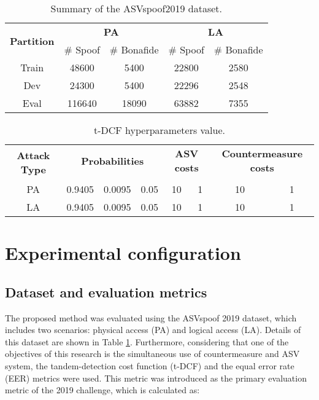 \documentclass[a4paper]{article}
\begin{document}
\begin{table}[H]
\caption{Summary of the ASVspoof2019 dataset.}
\centering
\begin{tabular}{|c|cc|cc|}
\hline
\multirow{2}{*}{\textbf{Partition}} & \multicolumn{2}{c|}{\textbf{PA}} & \multicolumn{2}{c|}{\textbf{LA}} \\ 
   & \# Spoof& \# Bonafide& \# Spoof& \# Bonafide \\ \hline
Train & \multicolumn{1}{c|}{48600}& \multicolumn{1}{c|}{5400}& \multicolumn{1}{c|}{22800}& \multicolumn{1}{c|}{2580}\\\hline
Dev & \multicolumn{1}{c|}{24300}& \multicolumn{1}{c|}{5400}& \multicolumn{1}{c|}{22296}& \multicolumn{1}{c|}{2548}\\\hline
Eval & \multicolumn{1}{c|}{116640}& \multicolumn{1}{c|}{18090}& \multicolumn{1}{c|}{63882}& \multicolumn{1}{c|}{7355}\\\hline
\end{tabular}
\label{tab:dataset}
\end{table}
\begin{table*}[th]
\centering
\caption{t-DCF hyperparameters value.}
\begin{tabular}{|c|ccc|cc|cc|}
\hline
\multirow{2}{*}{\textbf{Attack Type}} & \multicolumn{3}{c|}{\textbf{Probabilities}} & \multicolumn{2}{c|}{\textbf{ASV costs}} & \multicolumn{2}{c|}{\textbf{Countermeasure costs}} \\ 
   &                            &                            &     &   &  &   &  \\ \hline
PA & \multicolumn{1}{c|}{0.9405} & \multicolumn{1}{c|}{0.0095} & 0.05 & 10 & 1 & 10 & 1 \\ \hline
LA & \multicolumn{1}{c|}{0.9405} & \multicolumn{1}{c|}{0.0095} & 0.05 & 10 & 1 & 10 & 1 \\ \hline
\end{tabular}
\label{tab:datasethyperparam}
\end{table*}
\section{Experimental configuration}
\subsection{Dataset and evaluation metrics}
The proposed method was evaluated using the ASVspoof 2019 dataset, which includes two scenarios: physical access (PA) and logical access (LA). Details of this dataset are shown in Table \ref{tab:dataset}. Furthermore, considering that one of the objectives of this research is the simultaneous use of countermeasure and ASV system, the tandem-detection cost function (t-DCF) and the equal error rate (EER) metrics were used. This metric was introduced as the primary evaluation metric of the 2019 challenge, which is calculated as:
\end{document}
